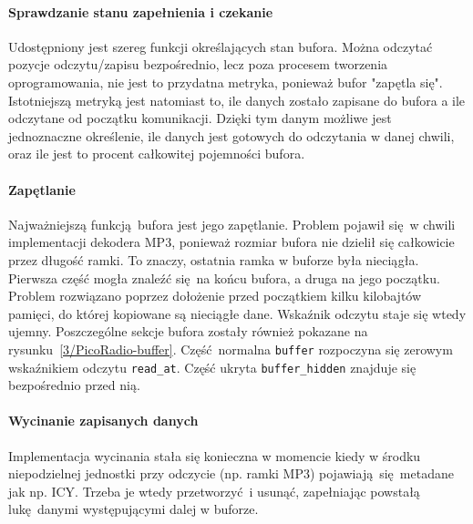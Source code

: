 \documentclass[polish]{aghengthesis}
\begin{document}
		\paragraph{Sprawdzanie stanu zapełnienia i czekanie}
			Udostępniony jest szereg funkcji określających stan bufora. Można odczytać pozycje odczytu/zapisu bezpośrednio, lecz poza procesem tworzenia oprogramowania, nie jest to przydatna metryka, ponieważ bufor "zapętla się". Istotniejszą metryką jest natomiast to, ile danych zostało zapisane do bufora a ile odczytane od początku komunikacji. Dzięki tym danym możliwe jest jednoznaczne określenie, ile danych jest gotowych do odczytania w danej chwili, oraz ile jest to procent całkowitej pojemności bufora.
		
		\paragraph{Zapętlanie}
			Najważniejszą funkcją bufora jest jego zapętlanie. Problem pojawił się w chwili implementacji dekodera MP3, ponieważ rozmiar bufora nie dzielił się całkowicie przez długość ramki. To znaczy, ostatnia ramka w buforze była nieciągła. Pierwsza część mogła znaleźć się na końcu bufora, a druga na jego początku. Problem rozwiązano poprzez dołożenie przed początkiem kilku kilobajtów pamięci, do której kopiowane są nieciągłe dane. Wskaźnik odczytu staje się wtedy ujemny. Poszczególne sekcje bufora zostały również pokazane na rysunku~\ref{3/PicoRadio-buffer}. Część normalna \lstinline|buffer| rozpoczyna się zerowym wskaźnikiem odczytu \lstinline|read_at|. Część ukryta \lstinline|buffer_hidden| znajduje się bezpośrednio przed nią.
		
		\paragraph{Wycinanie zapisanych danych}
			Implementacja wycinania stała się konieczna w momencie kiedy w środku niepodzielnej jednostki przy odczycie (np. ramki MP3) pojawiają się metadane jak np. ICY. Trzeba je wtedy przetworzyć i usunąć, zapełniając powstałą lukę danymi występującymi dalej w buforze.
	
\end{document}
